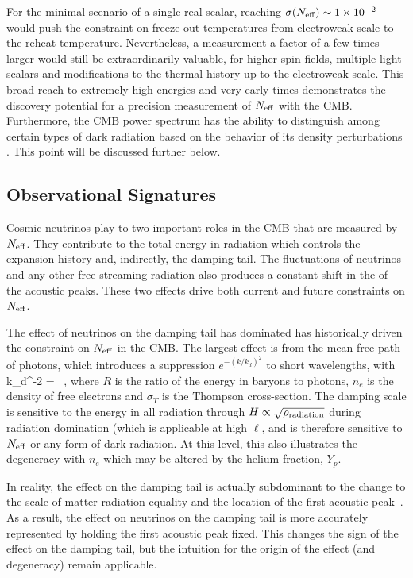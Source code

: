 For the minimal scenario of a single real scalar, reaching $\sigma(N_{\rm eff}) \sim 1\times 10^{-2}$ would push the constraint on freeze-out temperatures from electroweak scale to the reheat temperature.  Nevertheless, a measurement a factor of a few times larger would still be extraordinarily valuable, for higher spin fields, multiple light scalars and modifications to the thermal history up to the electroweak scale.  This broad reach to extremely high energies and very early times demonstrates the discovery potential for a precision measurement of $N_{\rm eff}$ with the CMB.  Furthermore, the CMB power spectrum has the ability to distinguish among certain types of dark radiation based on the behavior of its density perturbations  \cite{Chacko:2015noa,Baumann:2015rya}.  This point will be discussed further below.




\subsection{Observational Signatures}

Cosmic neutrinos play to two important roles in the CMB that are measured by $N_{\rm eff}$.  They contribute to the total energy in radiation which controls the expansion history and, indirectly, the damping tail.  The fluctuations of neutrinos and any other free streaming radiation also produces a constant shift in the of the acoustic peaks.  These two effects drive both current and future constraints on $N_{\rm eff}$.  

The effect of neutrinos on the damping tail has dominated has historically driven the constraint on $N_{\rm eff}$ in the CMB.  The largest effect is from the mean-free path of photons, which introduces a suppression $e^{-(k/k_d)^2}$ to short wavelengths, with~\cite{Zaldarriaga:1995gi}
\beq
k_d^{-2} =\int {}  \ ,
\eeq
where $R$ is the ratio of the energy in baryons to photons, $n_e$ is the density of free electrons and $\sigma_T$ is the Thompson cross-section.  The damping scale is sensitive to the energy in all radiation through $H \propto \sqrt{\rho_{\rm radiation}}$ during radiation domination (which is applicable at high $\ell$, and is therefore sensitive to $N_{\rm eff}$ or any form of dark radiation.  At this level, this also illustrates the degeneracy with $n_e$ which may be altered by the helium fraction, $Y_p$.

In reality, the effect on the damping tail is actually subdominant to the change to the scale of matter radiation equality and the location of the first acoustic peak~\cite{Hou:2011ec}.  As a result, the effect on neutrinos on the damping tail is more accurately represented by holding the first acoustic peak fixed.  This changes the sign of the effect on the damping tail, but the intuition for the origin of the effect (and degeneracy) remain applicable.

